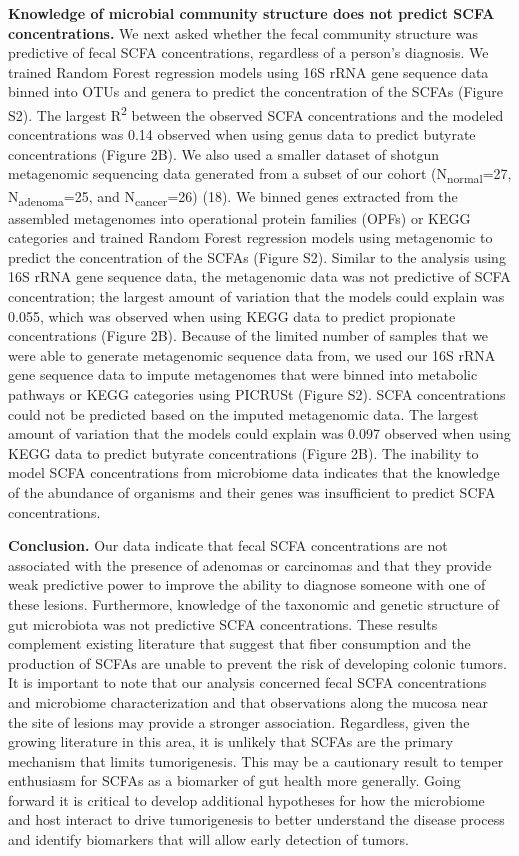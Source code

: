 \documentclass[11pt,]{article}
\begin{document}
\textbf{Knowledge of microbial community structure does not predict SCFA
concentrations.} We next asked whether the fecal community structure was
predictive of fecal SCFA concentrations, regardless of a person's
diagnosis. We trained Random Forest regression models using 16S rRNA
gene sequence data binned into OTUs and genera to predict the
concentration of the SCFAs (Figure S2). The largest R\textsuperscript{2}
between the observed SCFA concentrations and the modeled concentrations
was 0.14 observed when using genus data to predict butyrate
concentrations (Figure 2B). We also used a smaller dataset of shotgun
metagenomic sequencing data generated from a subset of our cohort
(N\textsubscript{normal}=27, N\textsubscript{adenoma}=25, and
N\textsubscript{cancer}=26) (18). We binned genes extracted from the
assembled metagenomes into operational protein families (OPFs) or KEGG
categories and trained Random Forest regression models using metagenomic
to predict the concentration of the SCFAs (Figure S2). Similar to the
analysis using 16S rRNA gene sequence data, the metagenomic data was not
predictive of SCFA concentration; the largest amount of variation that
the models could explain was 0.055, which was observed when using KEGG
data to predict propionate concentrations (Figure 2B). Because of the
limited number of samples that we were able to generate metagenomic
sequence data from, we used our 16S rRNA gene sequence data to impute
metagenomes that were binned into metabolic pathways or KEGG categories
using PICRUSt (Figure S2). SCFA concentrations could not be predicted
based on the imputed metagenomic data. The largest amount of variation
that the models could explain was 0.097 observed when using KEGG data to
predict butyrate concentrations (Figure 2B). The inability to model SCFA
concentrations from microbiome data indicates that the knowledge of the
abundance of organisms and their genes was insufficient to predict SCFA
concentrations.

\textbf{Conclusion.} Our data indicate that fecal SCFA concentrations
are not associated with the presence of adenomas or carcinomas and that
they provide weak predictive power to improve the ability to diagnose
someone with one of these lesions. Furthermore, knowledge of the
taxonomic and genetic structure of gut microbiota was not predictive
SCFA concentrations. These results complement existing literature that
suggest that fiber consumption and the production of SCFAs are unable to
prevent the risk of developing colonic tumors. It is important to note
that our analysis concerned fecal SCFA concentrations and microbiome
characterization and that observations along the mucosa near the site of
lesions may provide a stronger association. Regardless, given the
growing literature in this area, it is unlikely that SCFAs are the
primary mechanism that limits tumorigenesis. This may be a cautionary
result to temper enthusiasm for SCFAs as a biomarker of gut health more
generally. Going forward it is critical to develop additional hypotheses
for how the microbiome and host interact to drive tumorigenesis to
better understand the disease process and identify biomarkers that will
allow early detection of tumors.
\end{document}
